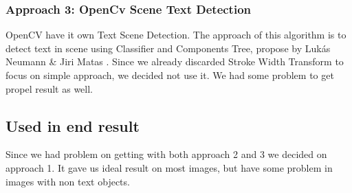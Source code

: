 \documentclass[Report.tex]{subfiles}
\begin{document}
\begin{flushleft}
  \subsubsection{Approach 3: OpenCv Scene Text Detection}
  OpenCV have it own Text Scene Detection. The approach of this algorithm is to detect text in scene using Classifier and Components Tree, propose by Lukás Neumann \& Jiri Matas \cite{neumann_real-time_2012}. Since we already discarded Stroke Width Transform to focus on simple approach, we decided not use it. We had some problem to get propel result as well.
\end{flushleft}

\subsection{Used in end result}
Since we had problem on getting with both approach 2 and 3 we decided on approach 1. It gave us ideal result on most images, but have some problem in images with non text objects.
\end{document}

